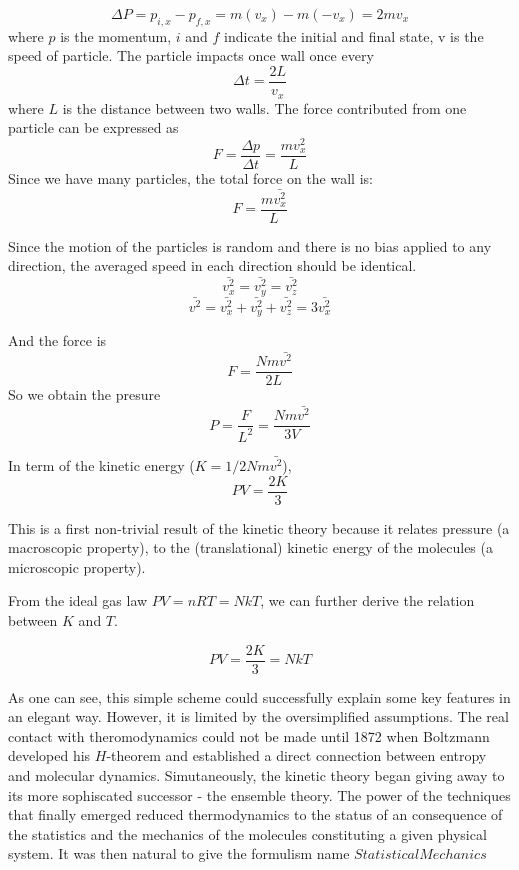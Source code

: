 \documentclass[twoside]{article}
\begin{document}
\begin{equation} \Delta P = p_{i,x} - p_{f,x} = m(v_x) - m(-v_x) = 2mv_x \end{equation}
where $p$ is the momentum, $i$ and $f$ indicate the initial and final state, v is the speed of particle.
The particle impacts once wall once every
\begin{equation} \Delta t = \frac{2L}{v_x} \end{equation}
where $L$ is the distance between two walls.
The force contributed from one particle can be expressed as 
\begin{equation} F = \frac{\Delta p}{\Delta t} = \frac{mv_x^2}{L}\end{equation}
Since we have many particles, the total force on the wall is:
\begin{equation} F = \frac{m\bar{v_x^2}}{L}\end{equation}

Since the motion of the particles is random and there is no bias applied to any direction, the averaged speed in each direction should be identical.
\begin{equation} \bar{v_x^2} = \bar{v_y^2} = \bar{v_z^2}  \end{equation}
\begin{equation} \bar{v^2} = \bar{v_x^2} + \bar{v_y^2} + \bar{v_z^2} = 3\bar{v_x^2} \end{equation}

And the force is
\begin{equation} F = \frac{Nm\bar{v^2}}{2L} \end{equation}
So we obtain the presure
\begin{equation} P = \frac{F}{L^2} = \frac{Nm\bar{v^2}}{3V} \end{equation}

In term of the kinetic energy ($K=1/2Nm\bar{v^2}$),
\begin{equation} PV = \frac{2K}{3} \end{equation}

This is a first non-trivial result of the kinetic theory because it relates pressure (a macroscopic property), to the (translational) kinetic energy of the molecules (a microscopic property).

From the ideal gas law $PV=nRT=NkT$, we can further derive the relation between $K$ and $T$.

\begin{equation} PV = \frac{2K}{3} = NkT \end{equation}

As one can see, this simple scheme could successfully explain some key features in an elegant way. 
However, it is limited by the oversimplified assumptions.
The real contact with theromodynamics could not be made until 1872 when Boltzmann developed his $H$-theorem and established a direct connection between entropy and molecular dynamics. 
Simutaneously, the kinetic theory began giving away to its more sophiscated successor - the ensemble theory.
The power of the techniques that finally emerged reduced thermodynamics to the status of an consequence of the statistics and the mechanics of the molecules constituting a given physical system.
It was then natural to give the formulism name $Statistical Mechanics$
\end{document}
